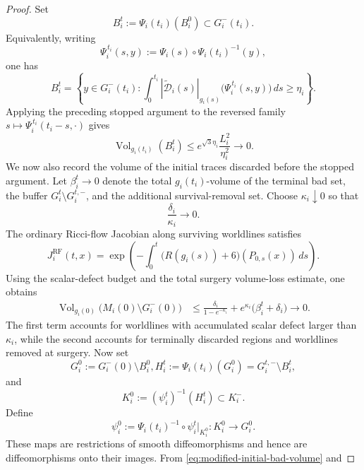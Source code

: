 \documentclass{amsart}
\begin{document}
\begin{proof}
\noindent
Set
\[
        B_i^t:=\Psi_i(t_i)(B_i^0)\subset G_i^-(t_i).
\]
Equivalently, writing
\[
        \Psi_i^{\,t_i}(s,y)
        :=
        \Psi_i(s)\circ\Psi_i(t_i)^{-1}(y),
\]
one has
\[
        B_i^t
        =
        \left\{
        y\in G_i^-(t_i):
        \int_0^{t_i}
        |\widetilde{\mathcal D}_i(s)|_{g_i(s)}
        \bigl(\Psi_i^{\,t_i}(s,y)\bigr)\,ds
        \geq\eta_i
        \right\}.
\]
Applying the preceding stopped argument to the reversed family
\(s\mapsto\Psi_i^{\,t_i}(t_i-s,\cdot)\) gives
\begin{equation}
\label{eq:modified-terminal-bad-volume}
        \operatorname{Vol}_{g_i(t_i)}(B_i^t)
        \leq
        e^{\sqrt{3}\eta_i}
        \frac{L_i^2}{\eta_i^2}
        \longrightarrow0 .
\end{equation}
We now also record the volume of the initial traces discarded before the
stopped argument. Let \(\beta_i^t\to0\) denote the total
\(g_i(t_i)\)-volume of the terminal bad set, the buffer
\(G_i^t\setminus G_i^{t,-}\), and the additional survival-removal set.
Choose \(\kappa_i\downarrow0\) so that
\[
        \frac{\delta_i}{\kappa_i}\to0.
\]
The ordinary Ricci-flow Jacobian along surviving worldlines satisfies
\[
        J_i^{\mathrm{RF}}(t,x)
        =
        \exp\left(
        -\int_0^t
        \bigl(R(g_i(s))+6\bigr)(P_{0,s}(x))\,ds
        \right).
\]
Using the scalar-defect budget and the total surgery volume-loss
estimate, one obtains
\begin{equation}
\label{eq:initial-trace-volume}
\begin{aligned}
        \operatorname{Vol}_{g_i(0)}
        \bigl(M_i(0)\setminus G_i^-(0)\bigr)
        &\leq
        \frac{\delta_i}{1-e^{-\kappa_i}}
        +
        e^{\kappa_i}\bigl(\beta_i^t+\delta_i\bigr)
        \longrightarrow0.
\end{aligned}
\end{equation}
The first term accounts for worldlines with accumulated scalar defect
larger than \(\kappa_i\), while the second accounts for terminally
discarded regions and worldlines removed at surgery. Now set
\[
        G_i^0:=G_i^-(0)\setminus B_i^0,
        H_i^t:=\Psi_i(t_i)(G_i^0)
        =
        G_i^{t,-}\setminus B_i^t,
\]
and
\[
        K_i^0:=(\psi_i^t)^{-1}(H_i^t)\subset K_i^-.
\]
Define
\[
        \psi_i^0
        :=
        \Psi_i(t_i)^{-1}\circ
        \psi_i^t\big|_{K_i^0}
        :
        K_i^0\longrightarrow G_i^0.
\]
These maps are restrictions of smooth diffeomorphisms and hence are
diffeomorphisms onto their images. From
\eqref{eq:modified-initial-bad-volume} and

\end{proof}
\end{document}
